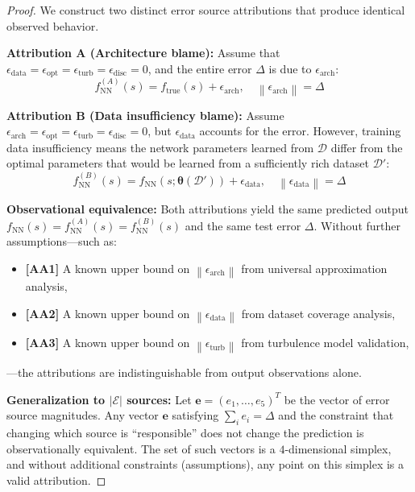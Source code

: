 \documentclass[11pt,a4paper]{article}
\theoremstyle{definition}
\theoremstyle{remark}
\newcommand{\assumptionTag}[1]{\textsf{\textbf{[A#1]}}}
\newcommand{\norm}[1]{\left\lVert#1\right\rVert}
\begin{document}
\begin{proof}
We construct two distinct error source attributions that produce identical observed behavior.

\textbf{Attribution A (Architecture blame):}
Assume that $\epsilon_{\text{data}} = \epsilon_{\text{opt}} = \epsilon_{\text{turb}} = \epsilon_{\text{disc}} = 0$, and the entire error $\Delta$ is due to $\epsilon_{\text{arch}}$:
\begin{equation}
f_{\text{NN}}^{(A)}(s) = f_{\text{true}}(s) + \epsilon_{\text{arch}}, \quad \norm{\epsilon_{\text{arch}}} = \Delta
\label{eq:attrA}
\end{equation}

\textbf{Attribution B (Data insufficiency blame):}
Assume $\epsilon_{\text{arch}} = \epsilon_{\text{opt}} = \epsilon_{\text{turb}} = \epsilon_{\text{disc}} = 0$, but $\epsilon_{\text{data}}$ accounts for the error.
However, training data insufficiency means the network parameters learned from $\mathcal{D}$ differ from the optimal parameters that would be learned from a sufficiently rich dataset $\mathcal{D}'$:
\begin{equation}
f_{\text{NN}}^{(B)}(s) = f_{\text{NN}}(s; \bm{\theta}(\mathcal{D}')) + \epsilon_{\text{data}}, \quad \norm{\epsilon_{\text{data}}} = \Delta
\label{eq:attrB}
\end{equation}

\textbf{Observational equivalence:}
Both attributions yield the same predicted output $f_{\text{NN}}(s) = f_{\text{NN}}^{(A)}(s) = f_{\text{NN}}^{(B)}(s)$ and the same test error $\Delta$.
Without further assumptions---such as:
\begin{itemize}[nosep]
    \item \assumptionTag{A1} A known upper bound on $\norm{\epsilon_{\text{arch}}}$ from universal approximation analysis,
    \item \assumptionTag{A2} A known upper bound on $\norm{\epsilon_{\text{data}}}$ from dataset coverage analysis,
    \item \assumptionTag{A3} A known upper bound on $\norm{\epsilon_{\text{turb}}}$ from turbulence model validation,
\end{itemize}
---the attributions are indistinguishable from output observations alone.

\textbf{Generalization to $|\mathcal{E}|$ sources:}
Let $\mathbf{e} = (e_1, \dots, e_5)^T$ be the vector of error source magnitudes.
Any vector $\mathbf{e}$ satisfying $\sum_i e_i = \Delta$ and the constraint that changing which source is ``responsible'' does not change the prediction is observationally equivalent.
The set of such vectors is a $4$-dimensional simplex, and without additional constraints (assumptions), any point on this simplex is a valid attribution.
\end{proof}
\end{document}
